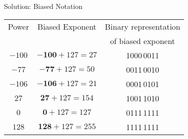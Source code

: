 \ifnum{}
\begin{frame}{Solution: Biased Notation}
\begin{table}[H]
\begin{center}
\begin{tabular}{ |c|c|c|}
    \hline 
    Power   & Biased Exponent  & Binary representation  \\
    & & of biased exponent\\
    \hline\hline
    $-100$ & $\mathbf{-100}+127 = 27$ & 1000\,0011   \\ \hline
    $-77$  & $\mathbf{-77}+127 = 50$ &  0011\,0010  \\ \hline
    $-106$ & $\mathbf{-106}+127 =21$  &  0001\,0101\\ \hline
    $27$   & $\mathbf{27}+127 =154$  &  1001\,1010\\ \hline
      $0$ & $\mathbf{0}+127 =127$  & 0111\,1111 \\ \hline
    $128$ &$\mathbf{128}+127 =255$  &  1111\,1111\\ \hline
\end{tabular}

\end{center}
\end{table}
\end{frame}
\fi





